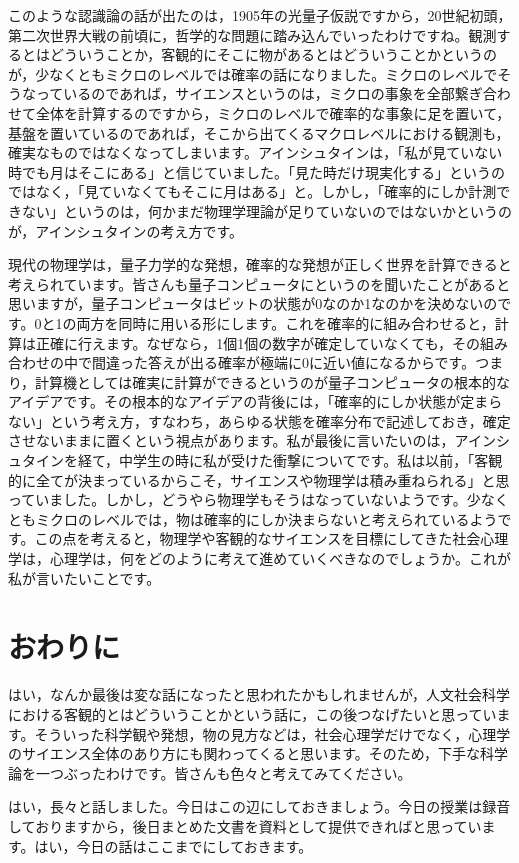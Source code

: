 \documentclass{ltjsbook}
\begin{document}
このような認識論の話が出たのは，1905年の光量子仮説ですから，20世紀初頭，第二次世界大戦の前頃に，哲学的な問題に踏み込んでいったわけですね。観測するとはどういうことか，客観的にそこに物があるとはどういうことかというのが，少なくともミクロのレベルでは確率の話になりました。ミクロのレベルでそうなっているのであれば，サイエンスというのは，ミクロの事象を全部繋ぎ合わせて全体を計算するのですから，ミクロのレベルで確率的な事象に足を置いて，基盤を置いているのであれば，そこから出てくるマクロレベルにおける観測も，確実なものではなくなってしまいます。アインシュタインは，「私が見ていない時でも月はそこにある」と信じていました。「見た時だけ現実化する」というのではなく，「見ていなくてもそこに月はある」と。しかし，「確率的にしか計測できない」というのは，何かまだ物理学理論が足りていないのではないかというのが，アインシュタインの考え方です。

現代の物理学は，量子力学的な発想，確率的な発想が正しく世界を計算できると考えられています。皆さんも量子コンピュータにというのを聞いたことがあると思いますが，量子コンピュータはビットの状態が0なのか1なのかを決めないのです。0と1の両方を同時に用いる形にします。これを確率的に組み合わせると，計算は正確に行えます。なぜなら，1個1個の数字が確定していなくても，その組み合わせの中で間違った答えが出る確率が極端に0に近い値になるからです。つまり，計算機としては確実に計算ができるというのが量子コンピュータの根本的なアイデアです。その根本的なアイデアの背後には，「確率的にしか状態が定まらない」という考え方，すなわち，あらゆる状態を確率分布で記述しておき，確定させないままに置くという視点があります。私が最後に言いたいのは，アインシュタインを経て，中学生の時に私が受けた衝撃についてです。私は以前，「客観的に全てが決まっているからこそ，サイエンスや物理学は積み重ねられる」と思っていました。しかし，どうやら物理学もそうはなっていないようです。少なくともミクロのレベルでは，物は確率的にしか決まらないと考えられているようです。この点を考えると，物理学や客観的なサイエンスを目標にしてきた社会心理学は，心理学は，何をどのように考えて進めていくべきなのでしょうか。これが私が言いたいことです。

\section{おわりに}
はい，なんか最後は変な話になったと思われたかもしれませんが，人文社会科学における客観的とはどういうことかという話に，この後つなげたいと思っています。そういった科学観や発想，物の見方などは，社会心理学だけでなく，心理学のサイエンス全体のあり方にも関わってくると思います。そのため，下手な科学論を一つぶったわけです。皆さんも色々と考えてみてください。

はい，長々と話しました。今日はこの辺にしておきましょう。今日の授業は録音しておりますから，後日まとめた文書を資料として提供できればと思っています。はい，今日の話はここまでにしておきます。
\end{document}
